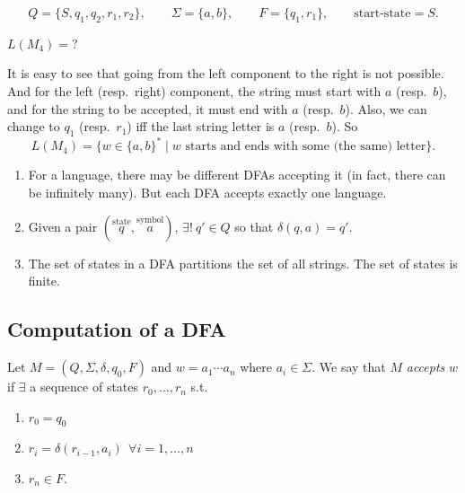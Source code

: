 \begin{example}
\begin{center}
\end{center}

\[
Q = \{S, q_1, q_2, r_1, r_2\}, \qquad \Sigma = \{a, b\}, \qquad F = \{q_1, r_1\}, \qquad \text{start-state} = S.
\]

\noindent $L(M_4) = ?$

\medskip
It is easy to see that going from the left component to the right is not possible. And for the left (resp.\ right) component, the string must start with $a$ (resp.\ $b$), and for the string to be accepted, it must end with $a$ (resp.\ $b$). Also, we can change to $q_1$ (resp.\ $r_1$) iff the last string letter is $a$ (resp.\ $b$). So
\[
L(M_4) = \{ w \in \{a,b\}^* \mid w \text{ starts and ends with some (the same) letter} \}.
\]
\end{example}

\begin{greybox}
\begin{remark}
\begin{enumerate}[(1)]
    \item For a language, there may be different DFAs accepting it (in fact, there can be infinitely many). But each DFA accepts exactly one language.
    \item Given a pair $(\overset{\text{state}}{q}, \overset{\text{symbol}}{a})$, $\exists! \ q' \in Q$ so that $\delta(q,a) = q'$.
    \item The set of states in a DFA partitions the set of all strings. The set of states is finite.
\end{enumerate}
\end{remark}
\end{greybox}

\subsection{Computation of a DFA}

Let $M = (Q, \Sigma, \delta, q_0, F)$ and $w = a_1 \cdots a_n$ where $a_i \in \Sigma$. We say that $M$ \emph{accepts} $w$ if $\exists$ a sequence of states $r_0, \dots, r_n$ s.t.
\begin{enumerate}[1)]
    \item $r_0 = q_0$
    \item $r_i = \delta(r_{i-1}, a_i)\ \ \forall i = 1, \dots, n$
    \item $r_n \in F$.
\end{enumerate}

